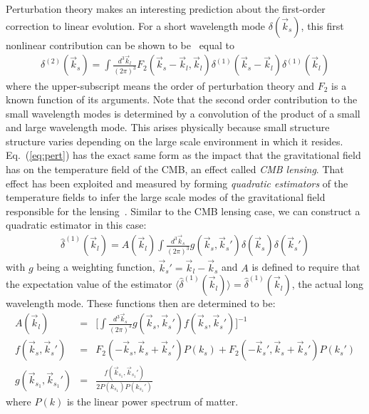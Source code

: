 \documentclass[12pt]{article}
\newcommand{\sfig}[2]{
\begin{center}
\texttt{[image: \#1]}
\end{center}
        }
\newcommand{\Spng}[2]{
    \begin{figure}[htb]
    \sfig{#1.png}{.5\columnwidth}
    \caption{{\small #2}}
    \label{fig:#1}
    \end{figure}
}
\newcommand{\ec}[1]{Eq.~(\ref{eq:#1})}
\newcommand{\eql}[1]{\label{eq:#1}}
\begin{document}
\begin{small}
%

Perturbation theory makes an interesting prediction about the first-order correction to linear evolution. For a short wavelength mode $\delta(\vec{k}_s)$, this first nonlinear contribution can be shown to be~\cite{Bernardeau:2001qr} equal to 
\begin{eqnarray}
\delta^{(2)}(\vec{k}_s)=\int\frac{d^{3}\vec{k}_l}{(2 \pi)^3}F_2(\vec{k}_s-\vec{k}_l,\vec{k}_l)\delta^{(1)}(\vec{k}_s-\vec{k}_l)\delta^{(1)}(\vec{k}_l)\eql{pert}
\end{eqnarray}
where the upper-subscript means the order of perturbation theory and $F_2$ is a known function of its arguments. Note that the second order contribution to the small wavelength modes is determined by a convolution of the product of a small and large wavelength mode. 
This arises physically because small structure structure varies depending on the large scale environment in which it resides. \ec{pert} has the exact same form as the impact that the gravitational field has on the temperature field of the CMB, an effect called \emph{CMB lensing}. That effect has been exploited and measured by forming \emph{quadratic estimators} of the temperature fields to infer the large scale modes of the gravitational field responsible for the lensing~\cite{Hu:2001tn}.
Similar to the CMB lensing case, we can construct a quadratic estimator in this case:
\begin{eqnarray}
\hat{\delta}^{(1)}(\vec{k}_l)=A(\vec{k}_l)\int \frac{d^3 \vec{k}_s}{(2\pi)^3} g(\vec{k}_s,\vec{k}_s')\delta(\vec{k}_s)\delta(\vec{k}_s')\eql{quad}
\end{eqnarray}
with $g$ being a weighting function, $\vec{k}_s'=\vec{k}_l-\vec{k}_s$ and $A$ is defined to require that the expectation value of the estimator $\langle \hat{\delta}^{(1)}(\vec{k}_l) \rangle=\hat{\delta}^{(1)}(\vec{k}_l)$, the actual long wavelength mode. These functions then are determined to be:
\begin{eqnarray}
A(\vec{k}_l)&=&\bigg[\int \frac{d^3 \vec{k}_s}{(2\pi)^3} g(\vec{k}_s,\vec{k}_s')f(\vec{k}_s,\vec{k}_s')  \bigg]^{-1} \\
f(\vec{k}_s,\vec{k}_s')&=&F_2(-\vec{k}_s,\vec{k}_s+\vec{k}_s')P(k_s)+F_2(-\vec{k}_s',\vec{k}_s+\vec{k}_s')P(k_s') \\
g(\vec{k}_{s_1},\vec{k}_{s_1}')&=&\frac{f(\vec{k}_{s_1},\vec{k}_{s_1}')}{2P(k_{s_1})P(k_{s_1}')}
\end{eqnarray}
where $P(k)$ is the linear power spectrum of matter.


\end{small}
\end{document}
